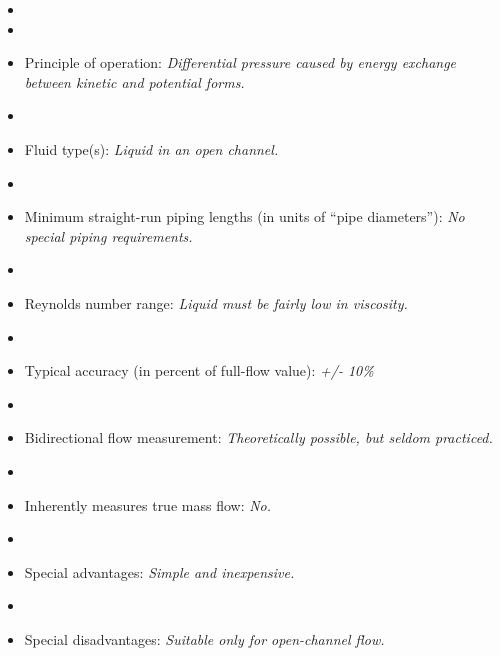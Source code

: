 \begin{itemize}
\goodbreak
\item{} 
\vskip 5pt
\item\item{} Principle of operation: {\it Differential pressure caused by energy exchange between kinetic and potential forms.}
\vskip 5pt
\item\item{} Fluid type(s): {\it Liquid in an open channel.}
\vskip 5pt
\item\item{} Minimum straight-run piping lengths (in units of ``pipe diameters''): {\it No special piping requirements.}
\vskip 5pt
\item\item{} Reynolds number range: {\it Liquid must be fairly low in viscosity.}
\vskip 5pt
\item\item{} Typical accuracy (in percent of full-flow value): {\it +/- 10\%}
\vskip 5pt
\item\item{} Bidirectional flow measurement: {\it Theoretically possible, but seldom practiced.}
\vskip 5pt
\item\item{} Inherently measures true mass flow: {\it No.}
\vskip 5pt
\item\item{} Special advantages: {\it Simple and inexpensive.}
\vskip 5pt
\item\item{} Special disadvantages: {\it Suitable only for open-channel flow.}
\end{itemize}

